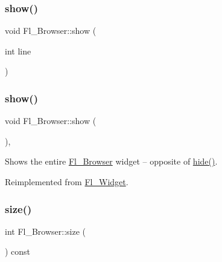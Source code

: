 \mbox{\label{class_fl___browser_a747329b9fc4ebe4c634f80e211e1518c}} 
\subsubsection{\texorpdfstring{show()}{show()}\hspace{0.1cm}{\footnotesize\ttfamily [1/2]}}
{\footnotesize\ttfamily void Fl\+\_\+\+Browser\+::show (\begin{DoxyParamCaption}\item[{int}]{line }\end{DoxyParamCaption})}

\mbox{\label{class_fl___browser_a606986c7d588114a399990c0c1495324}} 
\subsubsection{\texorpdfstring{show()}{show()}\hspace{0.1cm}{\footnotesize\ttfamily [2/2]}}
{\footnotesize\ttfamily void Fl\+\_\+\+Browser\+::show (\begin{DoxyParamCaption}{ }\end{DoxyParamCaption})\hspace{0.3cm}{\ttfamily [inline]}, {\ttfamily [virtual]}}

Shows the entire \hyperlink{class_fl___browser}{Fl\+\_\+\+Browser} widget -- opposite of \hyperlink{class_fl___browser_a23c16146f17a31b4e952a717b6f6f12d}{hide()}. 

Reimplemented from \hyperlink{class_fl___widget_a3b7971dc3a0385c31e71b9f3786eac2d}{Fl\+\_\+\+Widget}.

\mbox{\label{class_fl___browser_aa091ef8cad532a0ca99797f13d113fec}} 
\subsubsection{\texorpdfstring{size()}{size()}\hspace{0.1cm}{\footnotesize\ttfamily [1/2]}}
{\footnotesize\ttfamily int Fl\+\_\+\+Browser\+::size (\begin{DoxyParamCaption}{ }\end{DoxyParamCaption}) const\hspace{0.3cm}{\ttfamily [inline]}}

